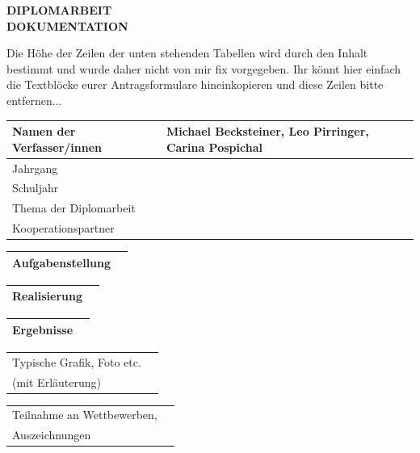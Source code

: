 \begin{center}
 \LARGE \textbf{DIPLOMARBEIT}\\
 \Large \textbf{DOKUMENTATION}\\
 \normalsize
\end{center}

Die Höhe der Zeilen der unten stehenden Tabellen wird durch den Inhalt bestimmt und wurde daher nicht von mir fix vorgegeben.
Ihr könnt hier einfach die Textblöcke eurer Antragsformulare hineinkopieren und diese Zeilen bitte entfernen...

\newlength{\feldC}
\newlength{\feldD}

\linespread{1.1} \normalsize
\begin{tabular}{|p{\feldC}|p{\feldD}|}
 \hline
 Namen der Verfasser/innen & Michael Becksteiner, Leo Pirringer, Carina Pospichal\\ 
 \hline 
 Jahrgang & \\ Schuljahr & \\
 \hline
 Thema der Diplomarbeit & \\
 \hline
 Kooperationspartner & \\
 \hline
\end{tabular}

\begin{tabular}{|p{\feldC}|p{\feldD}|}
 \hline
 Aufgabenstellung & \\
 \hline
\end{tabular}

\begin{tabular}{|p{\feldC}|p{\feldD}|}
 \hline
 Realisierung & \\
 \hline
\end{tabular}

\begin{tabular}{|p{\feldC}|p{\feldD}|}
 \hline
 Ergebnisse & \\
 \hline
\end{tabular}

\begin{tabular}{|p{\feldC}|p{\feldD}|}
 \hline
 Typische Grafik, Foto etc. & \\
  (mit Erläuterung) & \\
 \hline
\end{tabular}

\begin{tabular}{|p{\feldC}|p{\feldD}|}
 \hline
 Teilnahme an Wettbewerben, & \\
 Auszeichnungen & \\
 \hline
\end{tabular}

